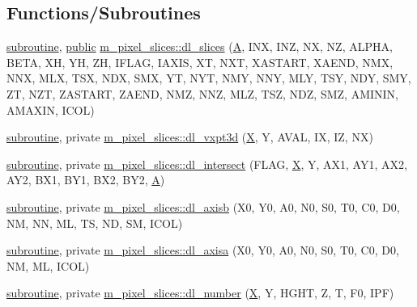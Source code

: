 \subsection*{Functions/\+Subroutines}
\begin{DoxyCompactItemize}
\item 
\hyperlink{M__stopwatch_83_8txt_acfbcff50169d691ff02d4a123ed70482}{subroutine}, \hyperlink{M__stopwatch_83_8txt_a2f74811300c361e53b430611a7d1769f}{public} \hyperlink{namespacem__pixel__slices_ac9e60bae24d6a1525af0da041bc1cf55}{m\+\_\+pixel\+\_\+slices\+::dl\+\_\+slices} (\hyperlink{ufpp__overview_81_8txt_a8341271e5f4e3003f6eb1c9547fc9d1a}{A}, I\+NX, I\+NZ, NX, NZ, A\+L\+P\+HA, B\+E\+TA, XH, YH, ZH, I\+F\+L\+AG, I\+A\+X\+IS, XT, N\+XT, X\+A\+S\+T\+A\+RT, X\+A\+E\+ND, N\+MX, N\+NX, M\+LX, T\+SX, N\+DX, S\+MX, YT, N\+YT, N\+MY, N\+NY, M\+LY, T\+SY, N\+DY, S\+MY, ZT, N\+ZT, Z\+A\+S\+T\+A\+RT, Z\+A\+E\+ND, N\+MZ, N\+NZ, M\+LZ, T\+SZ, N\+DZ, S\+MZ, A\+M\+I\+N\+IN, A\+M\+A\+X\+IN, I\+C\+OL)
\item 
\hyperlink{M__stopwatch_83_8txt_acfbcff50169d691ff02d4a123ed70482}{subroutine}, private \hyperlink{namespacem__pixel__slices_a61f419d67b700758eceed72e406a37f0}{m\+\_\+pixel\+\_\+slices\+::dl\+\_\+vxpt3d} (\hyperlink{intro__blas1_83_8txt_ac8596739bc875e90fe6e2ecf98e87906}{X}, Y, A\+V\+AL, IX, IZ, NX)
\item 
\hyperlink{M__stopwatch_83_8txt_acfbcff50169d691ff02d4a123ed70482}{subroutine}, private \hyperlink{namespacem__pixel__slices_a1508683ec3b2444091bb34d40b5d8b93}{m\+\_\+pixel\+\_\+slices\+::dl\+\_\+intersect} (F\+L\+AG, \hyperlink{intro__blas1_83_8txt_ac8596739bc875e90fe6e2ecf98e87906}{X}, Y, A\+X1, A\+Y1, A\+X2, A\+Y2, B\+X1, B\+Y1, B\+X2, B\+Y2, \hyperlink{ufpp__overview_81_8txt_a8341271e5f4e3003f6eb1c9547fc9d1a}{A})
\item 
\hyperlink{M__stopwatch_83_8txt_acfbcff50169d691ff02d4a123ed70482}{subroutine}, private \hyperlink{namespacem__pixel__slices_ab70907b4409a4346c450488b5bcb34a8}{m\+\_\+pixel\+\_\+slices\+::dl\+\_\+axisb} (X0, Y0, A0, N0, S0, T0, C0, D0, NM, NN, ML, TS, ND, SM, I\+C\+OL)
\item 
\hyperlink{M__stopwatch_83_8txt_acfbcff50169d691ff02d4a123ed70482}{subroutine}, private \hyperlink{namespacem__pixel__slices_afcc122fe448b5f806c0a372a203cd9ea}{m\+\_\+pixel\+\_\+slices\+::dl\+\_\+axisa} (X0, Y0, A0, N0, S0, T0, C0, D0, NM, ML, I\+C\+OL)
\item 
\hyperlink{M__stopwatch_83_8txt_acfbcff50169d691ff02d4a123ed70482}{subroutine}, private \hyperlink{namespacem__pixel__slices_a7d9372496e88c384aea5ad1b26750d1b}{m\+\_\+pixel\+\_\+slices\+::dl\+\_\+number} (\hyperlink{intro__blas1_83_8txt_ac8596739bc875e90fe6e2ecf98e87906}{X}, Y, H\+G\+HT, Z, T, F0, I\+PF)

\end{DoxyCompactItemize}
